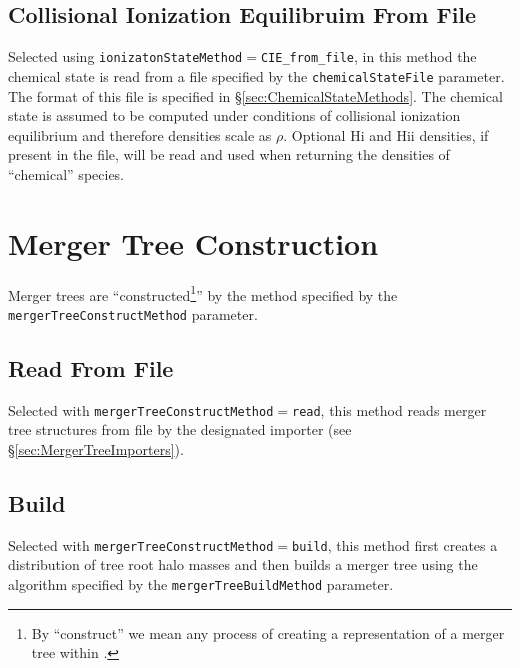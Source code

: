 \subsection{Collisional Ionization Equilibruim From File}

Selected using {\tt ionizatonStateMethod}$=${\tt CIE\_from\_file}, in this method the chemical state is read from a file specified by the {\tt chemicalStateFile} parameter. The format of this file is specified in \S\ref{sec:ChemicalStateMethods}. The chemical state is assumed to be computed under conditions of collisional ionization equilibrium and therefore densities scale as $\rho$. Optional H{\sc i} and H{\sc ii} densities, if present in the file, will be read and used when returning the densities of ``chemical'' species.

\section{Merger Tree Construction}

Merger trees are ``constructed\footnote{By ``construct'' we mean any process of creating a representation of a merger tree within \protect\glc.}'' by the method specified by the {\tt mergerTreeConstructMethod} parameter.

\subsection{Read From File}

Selected with {\tt mergerTreeConstructMethod}$=${\tt read}, this method reads merger tree structures from file by the designated importer (see \S\ref{sec:MergerTreeImporters}).

\subsection{Build}

Selected with {\tt mergerTreeConstructMethod}$=${\tt build}, this method first creates a distribution of tree root halo masses and then builds a merger tree using the algorithm specified by the {\tt mergerTreeBuildMethod} parameter.

